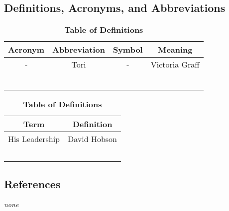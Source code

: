 \documentclass[12pt, titlepage]{article}
\begin{document}
\subsection{Definitions, Acronyms, and Abbreviations}
\label{sub:definitions_acronyms_and_abbreviations}
\begin{table}[h!]
\centering
\caption{\bf Table of Actronyms, Abbreviations, and Symbols}

\begin{tabular}{|c|c|c||c|}
\hline
{\bf Acronym} & {\bf Abbreviation} & {\bf Symbol} & {\bf Meaning}\\
\hline
{-} & {Tori} & {-} & {Victoria Graff}\\
\hline
{} & {} & {} & {}\\
\hline
{} & {} & {} & {}\\
\hline
{} & {} & {} & {}\\
\hline
{} & {} & {} & {}\\
\hline
{} & {} & {} & {}\\
\hline
{} & {} & {} & {}\\
\hline

\end{tabular}

\centering
\caption{\bf Table of Definitions}

\begin{tabular}{|c|c|}
\hline
{\bf Term} & {\bf Definition}\\
\hline
{His Leadership} & {David Hobson}\\
{} & {}\\
\hline
{} & {}\\
{} & {}\\
\hline
{} & {}\\
{} & {}\\
\hline
\end{tabular}

\end{table}

\subsection{References}
\label{sub:references}
\emph{none}
\end{document}
